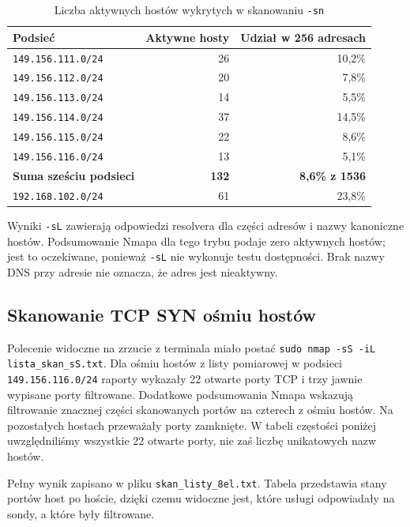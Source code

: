 \documentclass[11pt,a4paper]{article}
\begin{document}
\begin{table}[H]
\centering
\caption{Liczba aktywnych hostów wykrytych w skanowaniu \texttt{-sn}}
\begin{tabular}{lrr}
\toprule
\textbf{Podsieć} & \textbf{Aktywne hosty} & \textbf{Udział w 256 adresach}\\
\midrule
\texttt{149.156.111.0/24} & 26 & 10{,}2\%\\
\texttt{149.156.112.0/24} & 20 & 7{,}8\%\\
\texttt{149.156.113.0/24} & 14 & 5{,}5\%\\
\texttt{149.156.114.0/24} & 37 & 14{,}5\%\\
\texttt{149.156.115.0/24} & 22 & 8{,}6\%\\
\texttt{149.156.116.0/24} & 13 & 5{,}1\%\\
\midrule
\textbf{Suma sześciu podsieci} & \textbf{132} & \textbf{8{,}6\% z 1536}\\
\texttt{192.168.102.0/24} & 61 & 23{,}8\%\\
\bottomrule
\end{tabular}
\end{table}

Wyniki \texttt{-sL} zawierają odpowiedzi resolvera dla części adresów i nazwy
kanoniczne hostów. Podsumowanie Nmapa dla tego trybu podaje zero aktywnych hostów;
jest to oczekiwane, ponieważ \texttt{-sL} nie wykonuje testu dostępności. Brak
nazwy DNS przy adresie nie oznacza, że adres jest nieaktywny.

\subsection{Skanowanie TCP SYN ośmiu hostów}
Polecenie widoczne na zrzucie z terminala miało postać
\texttt{sudo nmap -sS -iL lista\_skan\_sS.txt}. Dla ośmiu hostów z listy
pomiarowej w podsieci \texttt{149.156.116.0/24} raporty
wykazały 22 otwarte porty TCP i trzy jawnie wypisane porty filtrowane. Dodatkowe
podsumowania Nmapa wskazują filtrowanie znacznej części skanowanych portów na
czterech z ośmiu hostów. Na pozostałych hostach przeważały porty zamknięte.
W tabeli częstości poniżej uwzględniliśmy wszystkie 22 otwarte porty, nie zaś
liczbę unikatowych nazw hostów.

Pełny wynik zapisano w pliku \texttt{skan\_listy\_8el.txt}. Tabela przedstawia
stany portów host po hoście, dzięki czemu widoczne jest, które usługi
odpowiadały na sondy, a które były filtrowane.
\end{document}
